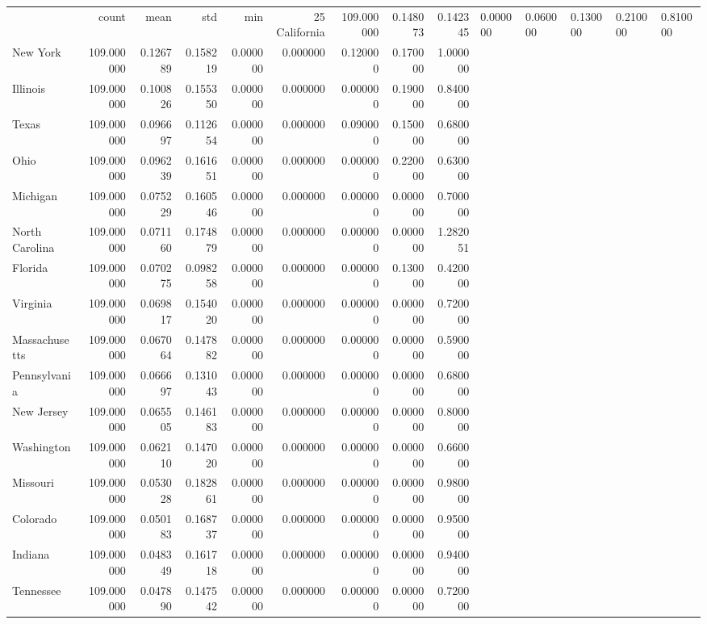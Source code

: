 \begin{tabular}{lrrrrrrrr}
\toprule
 & count & mean & std & min & 25%
\midrule
California & 109.000000 & 0.148073 & 0.142345 & 0.000000 & 0.060000 & 0.130000 & 0.210000 & 0.810000 \\
New York & 109.000000 & 0.126789 & 0.158219 & 0.000000 & 0.000000 & 0.120000 & 0.170000 & 1.000000 \\
Illinois & 109.000000 & 0.100826 & 0.155350 & 0.000000 & 0.000000 & 0.000000 & 0.190000 & 0.840000 \\
Texas & 109.000000 & 0.096697 & 0.112654 & 0.000000 & 0.000000 & 0.090000 & 0.150000 & 0.680000 \\
Ohio & 109.000000 & 0.096239 & 0.161651 & 0.000000 & 0.000000 & 0.000000 & 0.220000 & 0.630000 \\
Michigan & 109.000000 & 0.075229 & 0.160546 & 0.000000 & 0.000000 & 0.000000 & 0.000000 & 0.700000 \\
North Carolina & 109.000000 & 0.071160 & 0.174879 & 0.000000 & 0.000000 & 0.000000 & 0.000000 & 1.282051 \\
Florida & 109.000000 & 0.070275 & 0.098258 & 0.000000 & 0.000000 & 0.000000 & 0.130000 & 0.420000 \\
Virginia & 109.000000 & 0.069817 & 0.154020 & 0.000000 & 0.000000 & 0.000000 & 0.000000 & 0.720000 \\
Massachusetts & 109.000000 & 0.067064 & 0.147882 & 0.000000 & 0.000000 & 0.000000 & 0.000000 & 0.590000 \\
Pennsylvania & 109.000000 & 0.066697 & 0.131043 & 0.000000 & 0.000000 & 0.000000 & 0.000000 & 0.680000 \\
New Jersey & 109.000000 & 0.065505 & 0.146183 & 0.000000 & 0.000000 & 0.000000 & 0.000000 & 0.800000 \\
Washington & 109.000000 & 0.062110 & 0.147020 & 0.000000 & 0.000000 & 0.000000 & 0.000000 & 0.660000 \\
Missouri & 109.000000 & 0.053028 & 0.182861 & 0.000000 & 0.000000 & 0.000000 & 0.000000 & 0.980000 \\
Colorado & 109.000000 & 0.050183 & 0.168737 & 0.000000 & 0.000000 & 0.000000 & 0.000000 & 0.950000 \\
Indiana & 109.000000 & 0.048349 & 0.161718 & 0.000000 & 0.000000 & 0.000000 & 0.000000 & 0.940000 \\
Tennessee & 109.000000 & 0.047890 & 0.147542 & 0.000000 & 0.000000 & 0.000000 & 0.000000 & 0.720000 \\

\end{tabular}
